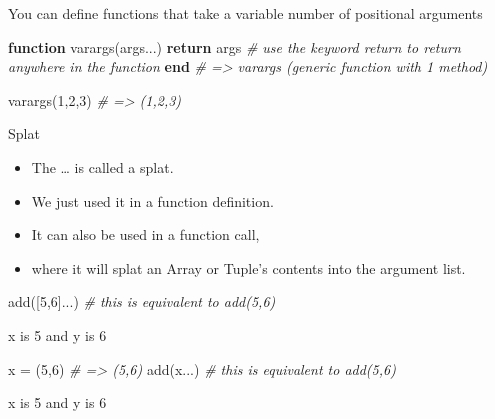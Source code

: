 \documentclass[ignorenonframetext,]{beamer}
\newenvironment{Shaded}{}{}
\newcommand{\KeywordTok}[1]{\textcolor[rgb]{0.00,0.44,0.13}{\textbf{{#1}}}}
\newcommand{\FloatTok}[1]{\textcolor[rgb]{0.25,0.63,0.44}{{#1}}}
\newcommand{\CommentTok}[1]{\textcolor[rgb]{0.38,0.63,0.69}{\textit{{#1}}}}
\newcommand{\NormalTok}[1]{{#1}}
\providecommand{\tightlist}{%
  \setlength{\itemsep}{0pt}\setlength{\parskip}{0pt}}
\begin{document}
\begin{frame}[fragile]{You can define functions that take a variable
number of positional arguments}

\begin{Shaded}
\begin{Highlighting}[]
\KeywordTok{function} \NormalTok{varargs(args...)}
    \KeywordTok{return} \NormalTok{args}
    \CommentTok{# use the keyword return to return anywhere in the function}
\KeywordTok{end}
\CommentTok{# => varargs (generic function with 1 method)}

\NormalTok{varargs(}\FloatTok{1}\NormalTok{,}\FloatTok{2}\NormalTok{,}\FloatTok{3}\NormalTok{) }\CommentTok{# => (1,2,3)}
\end{Highlighting}
\end{Shaded}

\end{frame}

\begin{frame}[fragile]{Splat}

\begin{itemize}
\tightlist
\item
  The \ldots{} is called a splat.
\item
  We just used it in a function definition.
\item
  It can also be used in a function call,
\item
  where it will splat an Array or Tuple's contents into the argument
  list.
\end{itemize}

\begin{Shaded}
\begin{Highlighting}[]
\NormalTok{add([}\FloatTok{5}\NormalTok{,}\FloatTok{6}\NormalTok{]...) }\CommentTok{# this is equivalent to add(5,6)}
\end{Highlighting}
\end{Shaded}

\begin{Shaded}
\begin{Highlighting}[]
\NormalTok{x is }\FloatTok{5} \NormalTok{and y is }\FloatTok{6}
\end{Highlighting}
\end{Shaded}

\begin{Shaded}
\begin{Highlighting}[]

\NormalTok{x = (}\FloatTok{5}\NormalTok{,}\FloatTok{6}\NormalTok{)     }\CommentTok{# => (5,6)}
\NormalTok{add(x...)     }\CommentTok{# this is equivalent to add(5,6)}
\end{Highlighting}
\end{Shaded}

\begin{Shaded}
\begin{Highlighting}[]
\NormalTok{x is }\FloatTok{5} \NormalTok{and y is }\FloatTok{6}
\end{Highlighting}
\end{Shaded}

\end{frame}
\end{document}
